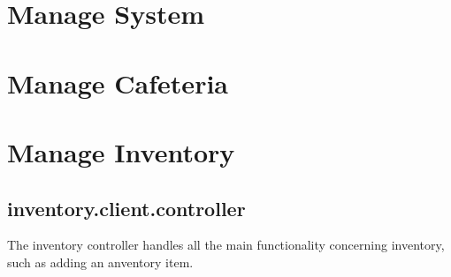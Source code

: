 \documentclass[a4paper,12pt]{article}
\begin{document}
\section{Manage System}
\section{Manage Cafeteria}
\section{Manage Inventory}
\subsection{inventory.client.controller}
 The inventory controller handles all the main functionality concerning inventory, such as adding an anventory item.
\end{document}
